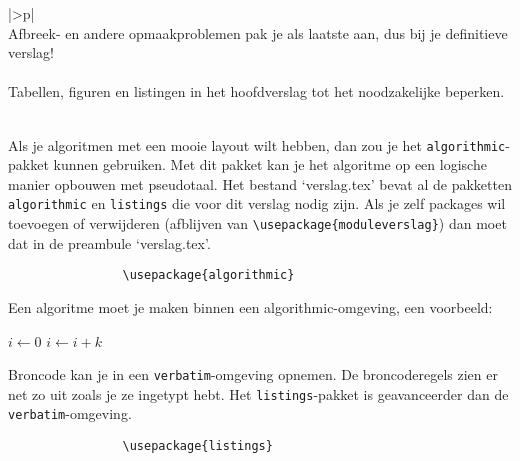 		\begin{center}
			\begin{tabular}{|>\C p{}|}
				\hline
				~\\
				Afbreek- en andere opmaakproblemen pak je als laatste aan,
				dus bij je definitieve verslag!\\
				~\\
				Tabellen, figuren en listingen in het hoofdverslag tot het
				noodzakelijke beperken.\\
				~\\
				\hline
			\end{tabular}
		\end{center}
		
		
		
		Als je algoritmen met een mooie layout wilt hebben, dan zou je het
		\verb!algorithmic!-pakket kunnen gebruiken. Met dit pakket kan je het
		algoritme op een logische manier opbouwen met pseudotaal. Het bestand
		`verslag.tex' bevat al de pakketten \verb!algorithmic! en
		\verb!listings! die voor dit verslag nodig zijn. Als je zelf packages
		wil toevoegen of verwijderen (afblijven van
		\verb!\usepackage{moduleverslag}!)  dan moet dat in de preambule
		`verslag.tex'.
		
		\begin{Aanpassen}
			\begin{verbatim}
				\usepackage{algorithmic}
			\end{verbatim}
		\end{Aanpassen}
		
		Een algoritme moet je maken binnen een algorithmic-omgeving, een
		voorbeeld:
		
		\begin{Aanpassen}[\small]
			\begin{algorithmic}
				\STATE $i\gets 0$
				\ELSE
				\STATE $i\gets i+k$
				\ENDIF
				\ENDIF 
			\end{algorithmic}
		\end{Aanpassen}
		
		
		Broncode kan je in een \verb!verbatim!-omgeving opnemen. De
		broncoderegels zien er net zo uit zoals je ze ingetypt hebt.  Het
		\verb!listings!-pakket is geavanceerder dan de
		\verb!verbatim!-omgeving.
		
		\begin{Aanpassen}
			\begin{verbatim}
				\usepackage{listings}
			\end{verbatim}
		\end{Aanpassen}
		
